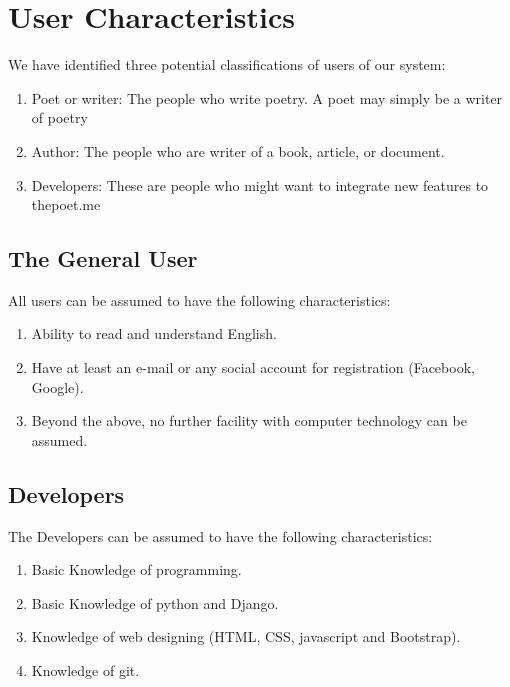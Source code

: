 \section{User Characteristics}

We have identified three potential classifications of users of our system:

\begin{enumerate}
    \item Poet or writer: The people who write poetry. A poet may simply be a writer of poetry
    \item Author: The people who are writer of a book, article, or document.
    \item Developers: These are people who might want to integrate new features to thepoet.me

\end{enumerate}

\subsection{The General User}

All users can be assumed to have the following characteristics:

\begin{enumerate}
    \item Ability to read and understand English.
    \item Have at least an e-mail or any social account for registration (Facebook, Google). 
    \item Beyond the above, no further facility with computer technology can be assumed.
\end{enumerate}

\subsection{Developers}
The Developers can be assumed to have the following characteristics:
\begin{enumerate}
    \item Basic Knowledge of programming.
    \item Basic Knowledge of python and Django.
    \item Knowledge of web designing (HTML, CSS, javascript and Bootstrap).
    \item Knowledge of git.
\end{enumerate}
